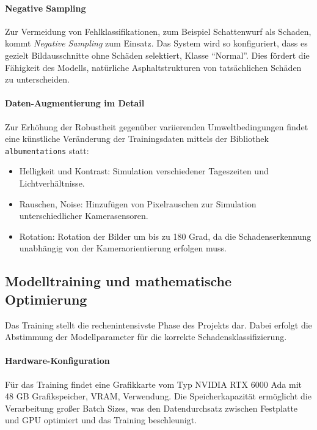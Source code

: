 \paragraph{Negative Sampling}
Zur Vermeidung von Fehlklassifikationen, zum Beispiel Schattenwurf als Schaden, kommt \emph{Negative Sampling} zum Einsatz. Das System wird so konfiguriert, dass es gezielt Bildausschnitte ohne Schäden selektiert, Klasse "`Normal"'. Dies fördert die Fähigkeit des Modells, natürliche Asphaltstrukturen von tatsächlichen Schäden zu unterscheiden.

\paragraph{Daten-Augmentierung im Detail}
Zur Erhöhung der Robustheit gegenüber variierenden Umweltbedingungen findet eine künstliche Veränderung der Trainingsdaten mittels der Bibliothek \texttt{albumentations} \cite{buslaev2020albumentations} statt:
\begin{itemize}
    \item Helligkeit und Kontrast: Simulation verschiedener Tageszeiten und Lichtverhältnisse.
    \item Rauschen, Noise: Hinzufügen von Pixelrauschen zur Simulation unterschiedlicher Kamerasensoren.
    \item Rotation: Rotation der Bilder um bis zu 180 Grad, da die Schadenserkennung unabhängig von der Kameraorientierung erfolgen muss.
\end{itemize}

\subsection{Modelltraining und mathematische Optimierung}
\label{subsec:modelltraining}

Das Training stellt die rechenintensivste Phase des Projekts dar. Dabei erfolgt die Abstimmung der Modellparameter für die korrekte Schadensklassifizierung.

\paragraph{Hardware-Konfiguration}
Für das Training findet eine Grafikkarte vom Typ NVIDIA RTX 6000 Ada mit 48 GB Grafikspeicher, VRAM, Verwendung. Die Speicherkapazität ermöglicht die Verarbeitung großer Batch Sizes, was den Datendurchsatz zwischen Festplatte und GPU optimiert und das Training beschleunigt.

